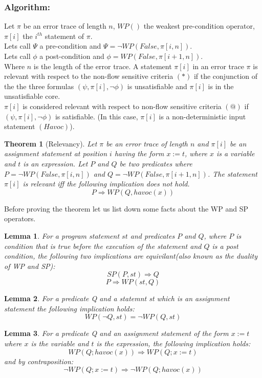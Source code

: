 \documentclass{article}
\newtheorem{theorem}{Theorem}
\newtheorem{lemma}{Lemma}
\begin{document}
\subsubsection{Algorithm:}
Let $\pi$ be an error trace of length $n$, $WP()$ the weakest pre-condition operator, $\pi[i]$ the $i^{th}$ statement of $\pi$.\\
Lets call $\Psi$ a pre-condition and $\Psi = \neg WP(False, \pi[i,n])$.\\
Lets call $\phi$ a post-condition and $\phi =  WP(False, \pi[i+1,n])$.\\
 Where $n$ is the length of the error trace.
A statement $\pi[i]$ in an error trace $\pi$ is relevant with respect to the non-flow sensitive criteria $(*)$ if the conjunction of the the three formulas $(\psi,\pi[i],\neg \phi) $ is unsatisfiable and $\pi[i]$ is in the unsatisfiable core.\\
$\pi[i]$ is considered relevant with respect to non-flow sensitive criteria $(@)$ if  $(\psi,\pi[i],\neg \phi) $ is satisfiable. (In this case, $\pi[i]$ is a non-deterministic input statement $(Havoc)$).\\
\begin{theorem}[Relevancy]
Let $\pi$ be an error trace of length $n$ and $\pi[i]$ be an assignment statement at position $i$ having the form $x:=t$, where $x$ is a variable and $t$ is an expression. Let $P$ and $Q$ be two predicates where $P = \neg WP(False, \pi[i,n])$ and $Q =  \neg WP(False, \pi[i+1,n])$. The statement $\pi[i]$ is relevant iff the following implication does not hold.
 $$P \Rightarrow WP(Q,havoc(x))$$
\end{theorem}
Before proving the theorem let us list down some facts about the WP and SP operators.\\
\begin{lemma}
For a program statement $st$ and predicates $P$ and $Q$, where $P$ is condition that is true before the execution of the statement and $Q$ is a post condition, the following two implications are equivilant(also known as the duality of WP and SP):
$$SP(P,st) \Rightarrow Q$$
$$P \Rightarrow WP(st,Q)$$
\end{lemma}

\begin{lemma}
For a predicate Q and a statemnt st which is an assignment statement the following implication holds:\\
$$WP(\neg Q,st) = \neg WP(Q,st)$$
\end{lemma}

\begin{lemma}
For a predicate Q and an assignment statement of the form $x:=t$ where $x$ is the variable and $t$ is the expression, the following implication holds:
$$WP(Q;havoc(x)) \Rightarrow WP(Q;x:=t)$$
and by contraposition:
$$\neg WP(Q;x:=t) \Rightarrow \neg WP(Q;havoc(x))$$
\end{lemma}
\end{document}
